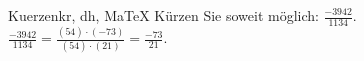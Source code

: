\begin{MAufgabe}{Kuerzen}{kr, dh, MaTeX}
K\"urzen Sie soweit m\"oglich: $\frac{-3942}{1134}$.\\ 
\ifLsg\MLoesung
\quad $\frac{-3942}{1134}=\frac{(54)\cdot(-73)}{(54)\cdot(21)}=\frac{-73}{21}$.\else\relax\fi
 \end{MAufgabe}